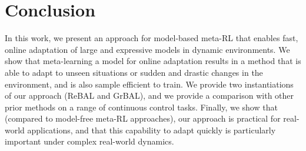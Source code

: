 \vspsec
\section{Conclusion}
\vspsec
In this work, we present an approach for model-based meta-RL that enables fast, online adaptation of large and expressive models in dynamic environments. We show that meta-learning a model for online adaptation results in a method that is able to adapt to unseen situations or sudden and drastic changes in the environment, and is also sample efficient to train. We provide two instantiations of our approach (ReBAL and GrBAL), and we provide a comparison with other prior methods on a range of continuous control tasks. Finally, we show that (compared to model-free meta-RL approaches), our approach is practical for real-world applications, and that this capability to adapt quickly is particularly important under complex real-world dynamics.